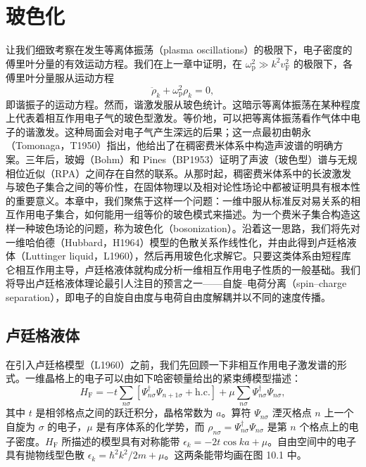 \chapter{玻色化}

让我们细致考察在发生等离体振荡（plasma oscillations）的极限下，电子密度的傅里叶分量的有效运动方程。我们在上一章中证明，在 $\omega_{\mathrm{p}}^{2}\gg k^{2}v_{\mathrm{F}}^{2}$ 的极限下，各傅里叶分量服从运动方程
\begin{equation*}
\ddot{\rho}_{k}+\omega_{\mathrm{p}}^{2}\rho_{k}=0,
\tag{10.1}
\end{equation*}
即谐振子的运动方程。然而，谐激发服从玻色统计。这暗示等离体振荡在某种程度上代表着相互作用电子气的玻色型激发。等价地，可以把等离体振荡看作气体中电子的谐激发。这种局面会对电子气产生深远的后果；这一点最初由朝永（Tomonaga，T1950）指出，他给出了在稠密费米体系中构造声波谱的明确方案。三年后，玻姆（Bohm）和 Pines（BP1953）证明了声波（玻色型）谱与无规相位近似（RPA）之间存在自然的联系。从那时起，稠密费米体系中的长波激发与玻色子集合之间的等价性，在固体物理以及相对论性场论中都被证明具有根本性的重要意义。本章中，我们聚焦于这样一个问题：一维中服从标准反对易关系的相互作用电子集合，如何能用一组等价的玻色模式来描述。为一个费米子集合构造这样一种玻色场论的问题，称为玻色化（bosonization）。沿着这一思路，我们将先对一维哈伯德（Hubbard，H1964）模型的色散关系作线性化，并由此得到卢廷格液体（Luttinger liquid，L1960），然后再用玻色化求解它。只要这类体系由短程库仑相互作用主导，卢廷格液体就构成分析一维相互作用电子性质的一般基础。我们将导出卢廷格液体理论最引人注目的预言之一——自旋–电荷分离（spin–charge separation），即电子的自旋自由度与电荷自由度解耦并以不同的速度传播。

\section{卢廷格液体}

在引入卢廷格模型（L1960）之前，我们先回顾一下非相互作用电子激发谱的形式。一维晶格上的电子可以由如下哈密顿量给出的紧束缚模型描述：
\begin{equation*}
H_{\mathrm{F}}=-t\sum_{n\sigma}\left[\Psi_{n\sigma}^{\dagger}\Psi_{n+1\sigma}+\mathrm{h.c.}\right]+\mu\sum_{n\sigma}\Psi_{n\sigma}^{\dagger}\Psi_{n\sigma},
\tag{10.2}
\end{equation*}
其中 $t$ 是相邻格点之间的跃迁积分，晶格常数为 $a$。算符 $\Psi_{n\sigma}$ 湮灭格点 $n$ 上一个自旋为 $\sigma$ 的电子，$\mu$ 是有序体系的化学势，而 $\rho_{n\sigma}=\Psi_{n\sigma}^{\dagger}\Psi_{n\sigma}$ 是第 $n$ 个格点上的电子密度。$H_{\mathrm{F}}$ 所描述的模型具有对称能带 $\epsilon_{k}=-2t\cos ka+\mu$。自由空间中的电子具有抛物线型色散 $\epsilon_{k}=\hbar^{2}k^{2}/2m+\mu$。这两条能带均画在图 10.1 中。

